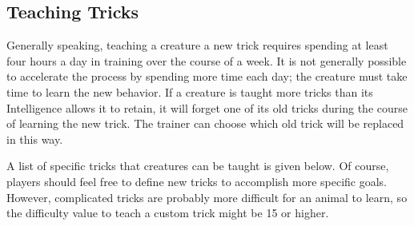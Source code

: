   \subsection{Teaching Tricks}
    Generally speaking, teaching a creature a new trick requires spending at least four hours a day in training over the course of a week.
    It is not generally possible to accelerate the process by spending more time each day; the creature must take time to learn the new behavior.
    If a creature is taught more tricks than its Intelligence allows it to retain, it will forget one of its old tricks during the course of learning the new trick.
    The trainer can choose which old trick will be replaced in this way.

    A list of specific tricks that creatures can be taught is given below.
    Of course, players should feel free to define new tricks to accomplish more specific goals.
    However, complicated tricks are probably more difficult for an animal to learn, so the difficulty value to teach a custom trick might be 15 or higher.

